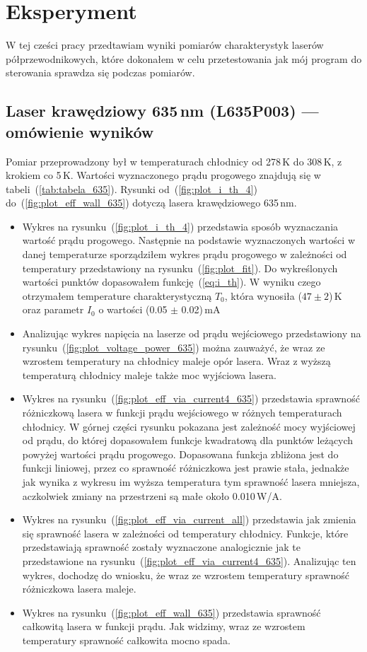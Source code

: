 \section{Eksperyment}
W tej cześci pracy przedtawiam wyniki pomiarów charakterystyk laserów półprzewodnikowych, które dokonałem w celu przetestowania
jak mój program do sterowania sprawdza się podczas pomiarów.
\subsection{Laser krawędziowy 635\,nm (L635P003) --- omówienie wyników}
Pomiar przeprowadzony był w temperaturach chłodnicy od 278\,K do 308\,K, z krokiem co 5\,K. Wartości wyznaczonego prądu progowego
znajdują się w tabeli~(\ref{tab:tabela_635}). Rysunki od~(\ref{fig:plot_i_th_4}) do~(\ref{fig:plot_eff_wall_635}) dotyczą lasera
krawędziowego 635\,nm.
\begin{itemize}
\item Wykres na rysunku~(\ref{fig:plot_i_th_4}) przedstawia sposób wyznaczania wartość prądu progowego. Następnie na podstawie
wyznaczonych wartości w danej temperaturze sporządziłem wykres prądu progowego w zależności od temperatury
przedstawiony na rysunku~(\ref{fig:plot_fit}). Do wykreślonych wartości punktów dopasowałem funkcję~(\ref{eq:i_th}).
W wyniku czego otrzymałem temperature charakterystyczną $T_0$, która wynosiła ($47 \pm 2$)\,K oraz parametr $I_0$ o wartości (0.05 $\pm$ 0.02)\,mA
\item Analizując wykres napięcia na laserze od prądu wejściowego przedstawiony na rysunku~(\ref{fig:plot_voltage_power_635})
można zauważyć, że wraz ze wzrostem temperatury na chłodnicy
maleje opór lasera. Wraz z wyższą temperaturą chłodnicy maleje także moc wyjściowa lasera.
\item Wykres na rysunku~(\ref{fig:plot_eff_via_current4_635}) przedstawia sprawność różniczkową lasera w funkcji prądu wejściowego
w różnych temperaturach chłodnicy. W górnej części rysunku pokazana jest zależność mocy wyjściowej od prądu, do której dopasowałem
funkcje kwadratową dla punktów leżących powyżej wartości prądu progowego. Dopasowana funkcja zbliżona jest do funkcji liniowej, przez co sprawność różniczkowa jest
prawie stała, jednakże jak wynika z wykresu im wyższa temperatura tym sprawność lasera mniejsza, aczkolwiek zmiany na
przestrzeni są małe około 0.010\,W/A.
\item Wykres na rysunku~(\ref{fig:plot_eff_via_current_all}) przedstawia jak zmienia się sprawność lasera w zależności od temperatury chłodnicy.
Funkcje, które przedstawiają sprawność zostały wyznaczone analogicznie jak te przedstawione na rysunku~(\ref{fig:plot_eff_via_current4_635}).
Analizując ten wykres, dochodzę do wniosku, że wraz ze wzrostem temperatury sprawność różniczkowa lasera maleje.
\item Wykres na rysunku~(\ref{fig:plot_eff_wall_635}) przedstawia sprawność całkowitą lasera w funkcji prądu. Jak widzimy,
wraz ze wzrostem temperatury sprawność całkowita mocno spada.
\end{itemize}
